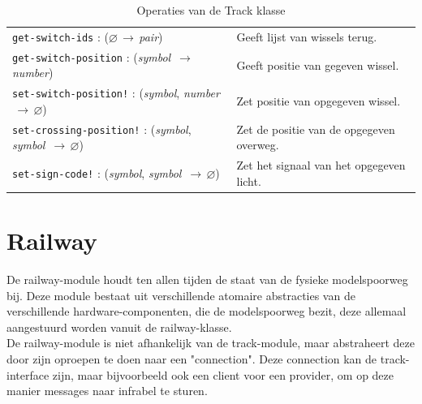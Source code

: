 \documentclass[a4paper, 11pt]{article}
\newcommand{\naar}{\,$\rightarrow$\,}
\renewcommand{\empty}{$\varnothing$}
\newcommand{\<}{\scriptsize\textless\normalsize}
\renewcommand{\>}{\scriptsize\textgreater\normalsize}
\begin{document}
\begin{table}[H]
\begin{center}
{\begin{tabular}{|l l|}
			\texttt{get-switch-ids} : (\empty \naar \textit{pair}) & Geeft lijst van wissels terug.\\
			\texttt{get-switch-position} : (\textit{symbol} \naar \textit{number}) & Geeft positie van gegeven wissel.\\
			\texttt{set-switch-position!} : (\textit{symbol}, \textit{number} \naar \empty) & Zet positie van opgegeven wissel.\\
			\texttt{set-crossing-position!} : (\textit{symbol}, \textit{symbol} \naar \empty) & Zet de positie van de opgegeven overweg.\\
			\texttt{set-sign-code!} : (\textit{symbol}, \textit{symbol} \naar \empty) & Zet het signaal van het opgegeven licht.\\
			\hline
		\end{tabular}}
		\caption{Operaties van de Track klasse}
	\end{center}
\end{table}

\newpage
\section{Railway} %
De railway-module houdt ten allen tijden de staat van de fysieke modelspoorweg bij. Deze module bestaat uit verschillende atomaire abstracties van de verschillende hardware-componenten, die de modelspoorweg bezit, deze allemaal aangestuurd worden vanuit de railway-klasse.
\newline\\
De railway-module is niet afhankelijk van de track-module, maar abstraheert deze door zijn oproepen te doen naar een "connection". Deze connection kan de track-interface zijn, maar bijvoorbeeld ook een client voor een provider, om op deze manier messages naar infrabel te sturen.

\end{document}
